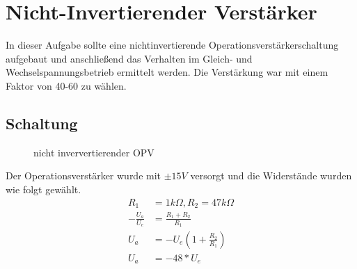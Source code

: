 
\section{Nicht-Invertierender Verst\"arker}

In dieser Aufgabe sollte eine nichtinvertierende Operationsverstärkerschaltung aufgebaut und anschließend das Verhalten im
Gleich- und Wechselspannungsbetrieb ermittelt werden. Die Verstärkung war mit einem Faktor von 40-60 zu wählen.\\

\subsection{Schaltung}
\begin{figure}[H]
  \begin{center}
    \caption{nicht inververtierender OPV}
  \end{center}
\end{figure}
\noindent
Der Operationsverstärker wurde mit $\pm15V$ versorgt und die Widerstände wurden wie folgt gewählt.\\
\begin{align*}
 R_1 &= 1k\Omega, R_2 = 47k\Omega\\
 -\frac{U_a}{U_e} &= \frac{R_1 + R_2}{R_1}\\
 U_a &= -U_e(1 + \frac{R_2}{R_1})\\
 U_a &= -48*U_e\\
\end{align*}

